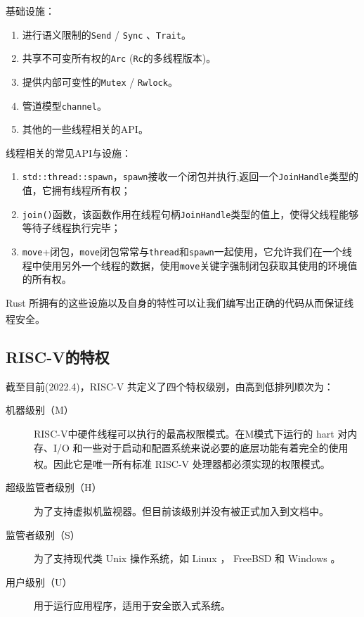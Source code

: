 \documentclass[UTF8,fontset=none,linespread=1.15]{ctexart}
\let\nosupcite\cite
\renewcommand*{\cite}[1]{\textsuperscript{\nosupcite{#1}}}
\begin{document}
\noindent 基础设施：

\begin{enumerate}
\item 进行语义限制的\texttt{Send} / \texttt{Sync} 、\texttt{Trait}。
\item 共享不可变所有权的\texttt{Arc} (\texttt{Rc}的多线程版本)。
\item 提供内部可变性的\texttt{Mutex} / \texttt{Rwlock}。
\item 管道模型\texttt{channel}。
\item 其他的一些线程相关的API。
\end{enumerate}

\noindent 线程相关的常见API与设施：

\begin{enumerate}
\item \texttt{std::thread::spawn}，\texttt{spawn}接收一个闭包并执行,返回一个\texttt{JoinHandle}类型的值，它拥有线程所有权；
\item  \texttt{join()}函数，该函数作用在线程句柄\texttt{JoinHandle}类型的值上，使得父线程能够等待子线程执行完毕；
\item \texttt{move}+闭包，\texttt{move}闭包常常与\texttt{thread}和\texttt{spawn}一起使用，它允许我们在一个线程中使用另外一个线程的数据，使用\texttt{move}关键字强制闭包获取其使用的环境值的所有权。
\end{enumerate}

Rust 所拥有的这些设施以及自身的特性可以让我们编写出正确的代码从而保证线程安全。\cite{9}


\subsection{RISC-V的特权}
截至目前(2022.4)，RISC-V 共定义了四个特权级别，由高到低排列顺次为：

\begin{description}
\item[机器级别（M）] RISC-V中硬件线程可以执行的最高权限模式。在M模式下运行的 hart 对内存、I/O 和一些对于启动和配置系统来说必要的底层功能有着完全的使用权。因此它是唯一所有标准 RISC-V 处理器都必须实现的权限模式。\cite{a}
\item[超级监管者级别（H）] 为了支持虚拟机监视器。但目前该级别并没有被正式加入到文档中。
\item[监管者级别（S）] 为了支持现代类 Unix 操作系统，如 Linux ， FreeBSD 和 Windows 。
\item[用户级别（U）] 用于运行应用程序，适用于安全嵌入式系统。
\end{description}
\end{document}

